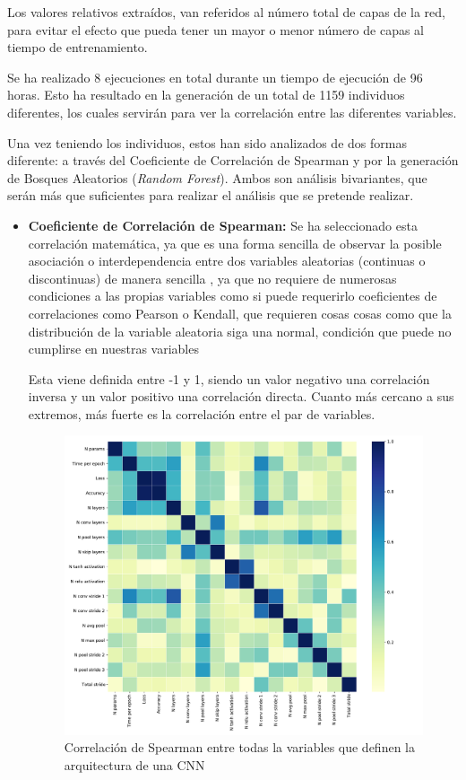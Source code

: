 Los valores relativos extraídos, van referidos al número total de capas de la red, para evitar el efecto que pueda tener un mayor o menor  número de capas al tiempo de entrenamiento.

Se ha realizado 8 ejecuciones en total durante un tiempo de ejecución de 96 horas. Esto ha resultado en la generación de un total de 1159 individuos diferentes, los cuales servirán para ver la correlación entre las diferentes variables.

Una vez teniendo los individuos, estos han sido analizados de dos formas diferente: a través del Coeficiente de Correlación de Spearman y por la generación de Bosques Aleatorios (\textit{Random Forest}). Ambos son análisis bivariantes, que serán más que suficientes para realizar el análisis que se pretende realizar.

\begin{itemize}
    \item \textbf{Coeficiente de Correlación de Spearman:} \cite{daniel1990applied} Se ha seleccionado esta correlación matemática, ya que es una forma sencilla de observar la posible asociación o interdependencia entre dos variables aleatorias (continuas o discontinuas) de manera sencilla \cite{Mukaka2012}, ya que no requiere de numerosas condiciones a las propias variables como si puede requerirlo coeficientes de correlaciones como Pearson o Kendall, que requieren cosas cosas como que la distribución de la variable aleatoria siga una normal, condición que puede no cumplirse en nuestras variables 
    
    Esta viene definida entre -1 y 1, siendo un valor negativo una correlación inversa y un valor positivo una correlación directa. Cuanto más cercano a sus extremos, más fuerte es la correlación entre el par de variables.
    
    \begin{figure}[h]
        \centering
        \includegraphics[width=\textwidth]{figuras/experimentos/correlacion/spearman_corr.pdf}
        \caption{Correlación de Spearman entre todas la variables que definen la arquitectura de una CNN}
        \label{fig:todas_correlaciones}
    \end{figure}
    

\end{itemize}
